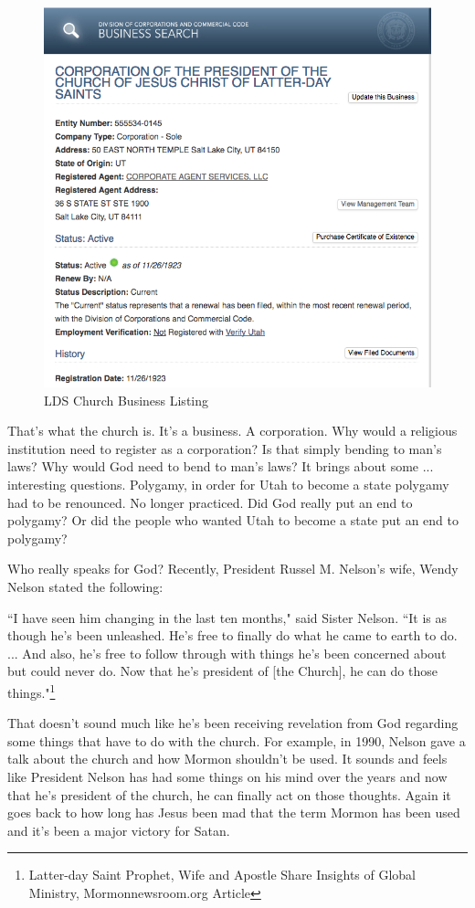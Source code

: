\begin{figure}[h!]
  \centering
  \includegraphics[width=1\linewidth]{articles/images/business.png}
  \caption{LDS Church Business Listing}
  \label{fig:business}
\end{figure}

That's what the church is. It's a business. A corporation. Why would a religious
institution need to register as a corporation? Is that simply bending to man's laws?
Why would God need to bend to man's laws? It brings about some ... interesting
questions. Polygamy, in order for Utah to become a state polygamy had to be
renounced. No longer practiced. Did God really put an end to polygamy? Or did the
people who wanted Utah to become a state put an end to polygamy?

Who really speaks for God? Recently, President Russel M. Nelson's wife, Wendy Nelson
stated the following:

\begin{displayquote}
``I have seen him changing in the last ten months," said Sister Nelson. ``It is as 
though he's been unleashed. He's free to finally do what he came to earth to do. ... 
And also, he's free to follow through with things he's been concerned about but 
could never do. Now that he's president of [the Church], he can do those
things."\footnote{Latter-day Saint Prophet, Wife and Apostle Share Insights 
of Global Ministry, Mormonnewsroom.org Article}
\end{displayquote}

That doesn't sound much like he's been receiving revelation from God regarding some
things that have to do with the church. For example, in 1990, Nelson gave a talk
about the church and how Mormon shouldn't be used. It sounds and feels like President
Nelson has had some things on his mind over the years and now that he's president of
the church, he can finally act on those thoughts. Again it goes back to how long has
Jesus been mad that the term Mormon has been used and it's been a major victory for
Satan.